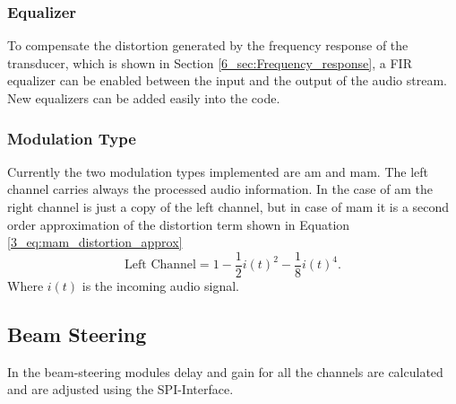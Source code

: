 \subsubsection{Equalizer}
To compensate the distortion generated by the frequency response of the transducer, which is shown in Section \ref{6_sec:Frequency_response}, a FIR equalizer can be enabled between the input and the output of the audio stream. New equalizers can be added easily into the code. 
\subsubsection{Modulation Type}
Currently the two modulation types implemented are \acrshort{am} and \acrshort{mam}.
The left channel carries always the processed audio information.
In the case of \acrshort{am} the right channel is just a copy of the left channel, but in case of \acrshort{mam} it is a second order approximation of the distortion term shown in Equation \ref{3_eq:mam_distortion_approx} 
\begin{equation}
    \text{Left Channel} = 1 - \frac{1}{2}i(t)^2 - \frac{1}{8}i(t)^4.
\end{equation}
Where $i(t)$ is the incoming audio signal. 
\subsection{Beam Steering}
In the beam-steering modules delay and gain for all the channels are calculated and are adjusted using the SPI-Interface. 

